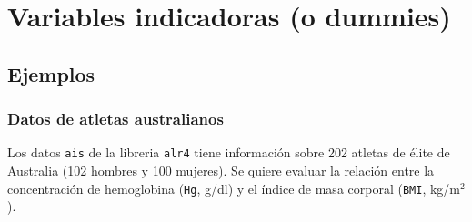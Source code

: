 \documentclass[
]{article}
\newenvironment{Shaded}{\begin{snugshade}}{\end{snugshade}}
\newcommand{\AttributeTok}[1]{\textcolor[rgb]{0.77,0.63,0.00}{#1}}
\newcommand{\DecValTok}[1]{\textcolor[rgb]{0.00,0.00,0.81}{#1}}
\newcommand{\FunctionTok}[1]{\textcolor[rgb]{0.00,0.00,0.00}{#1}}
\newcommand{\NormalTok}[1]{#1}
\newcommand{\SpecialCharTok}[1]{\textcolor[rgb]{0.00,0.00,0.00}{#1}}
\newcommand{\StringTok}[1]{\textcolor[rgb]{0.31,0.60,0.02}{#1}}
\begin{document}
\hypertarget{variables-indicadoras-o-dummies}{%
\section{Variables indicadoras (o dummies)}\label{variables-indicadoras-o-dummies}}

\hypertarget{ejemplos}{%
\subsection{Ejemplos}\label{ejemplos}}

\hypertarget{datos-de-atletas-australianos}{%
\subsubsection{Datos de atletas australianos}\label{datos-de-atletas-australianos}}

Los datos \texttt{ais} de la libreria \texttt{alr4} tiene información sobre 202 atletas de élite de Australia (102 hombres y 100 mujeres). Se quiere evaluar la relación entre la concentración de hemoglobina (\texttt{Hg}, g/dl) y el índice de masa corporal (\texttt{BMI}, kg/m\(^2\)).

\begin{Shaded}
\end{Shaded}
\end{document}
